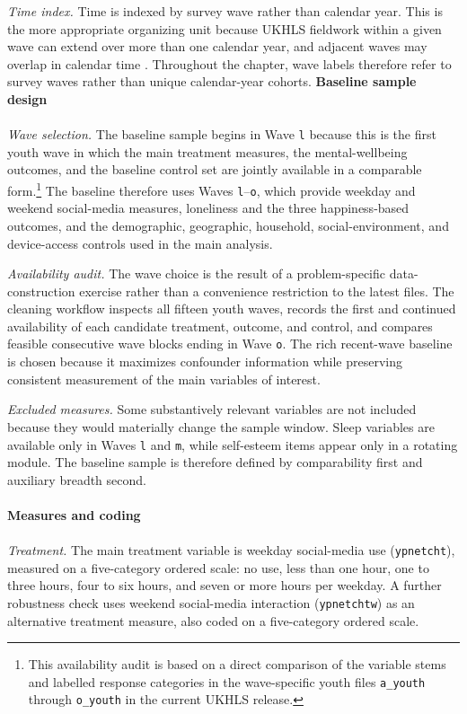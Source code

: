 \documentclass[11pt,oneside,a4paper]{book}
\begin{document}
\textit{Time index.} Time is indexed by survey wave rather than calendar year. This is the more appropriate organizing unit because UKHLS fieldwork within a given wave can extend over more than one calendar year, and adjacent waves may overlap in calendar time \citep{iser2025userguide}. Throughout the chapter, wave labels therefore refer to survey waves rather than unique calendar-year cohorts.
\newpage \noindent
\textbf{Baseline sample design}\\
\\
\textit{Wave selection.} The baseline sample begins in Wave \texttt{l} because this is the first youth wave in which the main treatment measures, the mental-wellbeing outcomes, and the baseline control set are jointly available in a comparable form.\footnote{This availability audit is based on a direct comparison of the variable stems and labelled response categories in the wave-specific youth files \texttt{a\_youth} through \texttt{o\_youth} in the current UKHLS release.} The baseline therefore uses Waves \texttt{l}--\texttt{o}, which provide weekday and weekend social-media measures, loneliness and the three happiness-based outcomes, and the demographic, geographic, household, social-environment, and device-access controls used in the main analysis.

\textit{Availability audit.} The wave choice is the result of a problem-specific data-construction exercise rather than a convenience restriction to the latest files. The cleaning workflow inspects all fifteen youth waves, records the first and continued availability of each candidate treatment, outcome, and control, and compares feasible consecutive wave blocks ending in Wave \texttt{o}. The rich recent-wave baseline is chosen because it maximizes confounder information while preserving consistent measurement of the main variables of interest.

\textit{Excluded measures.} Some substantively relevant variables are not included because they would materially change the sample window. Sleep variables are available only in Waves \texttt{l} and \texttt{m}, while self-esteem items appear only in a rotating module. The baseline sample is therefore defined by comparability first and auxiliary breadth second.\\
\\
\textbf{Measures and coding}\\
\\
\textit{Treatment.} The main treatment variable is weekday social-media use (\texttt{ypnetcht}), measured on a five-category ordered scale: no use, less than one hour, one to three hours, four to six hours, and seven or more hours per weekday. A further robustness check uses weekend social-media interaction (\texttt{ypnetchtw}) as an alternative treatment measure, also coded on a five-category ordered scale.
\end{document}

